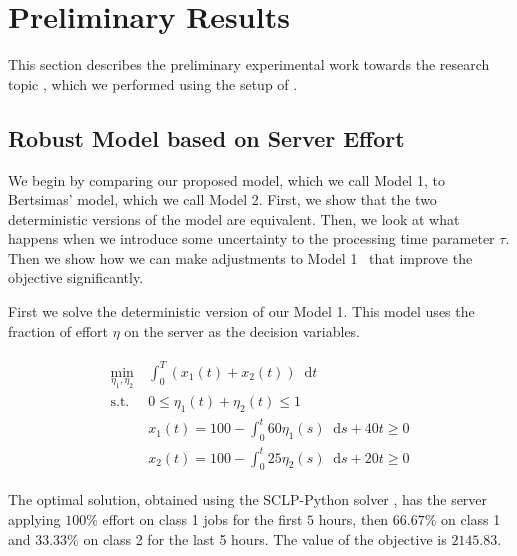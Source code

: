 \documentclass[11pt,a4paper,titlepage]{article}
\newcommand*{\dd}{\ensuremath{\mathop{}\!\mathrm{d}}}%
\theoremstyle{definition}
\theoremstyle{plain}
\begin{document}
    \section{Preliminary Results}
    \label{sec:results}

    \newcommand{\modelone}{Model 1}
    \newcommand{\modeltwo}{Model 2}

    This section describes the preliminary experimental work towards the research topic ,
    which we performed using the setup of .

    \subsection{Robust Model based on Server Effort}
    \label{subsec:results:server-effort-model}

    We begin by comparing our proposed model,
    which we call \modelone,
    to Bertsimas' model,
    which we call \modeltwo.
    First, we show that the two deterministic versions of the model are equivalent.
    Then,
    we look at what happens when we introduce some uncertainty to the processing time parameter $\tau$.
    Then we show how we can make adjustments to \modelone~ that improve the objective significantly.

    First we solve the deterministic version of our \modelone.
    This model uses the fraction of effort $\eta$ on the server as the decision variables.

    \begin{align}
        \label{eq:model-1}
        \begin{split}
            \min\limits_{\eta_1, \eta_2}
            &~ \int_0^T \left( x_1(t) + x_2(t) \right) \dd t \\
            \text{s.t.}
            &~ 0 \leq \eta_1(t) + \eta_2(t) \leq 1 \\
            &~ x_1(t) = 100 - \int_0^t 60 \eta_1(s) \dd s + 40t \geq 0 \\
            &~ x_2(t) = 100 - \int_0^t 25 \eta_2(s) \dd s + 20t \geq 0
        \end{split}
    \end{align}

    The optimal solution,
    obtained using the SCLP-Python solver \autocite{Shindin_SCLPPython_2021},
    has the server applying $100\%$ effort on class 1 jobs for the first $5$ hours,
    then $66.67\%$ on class 1 and 33.33\% on class 2 for the last 5 hours.
    The value of the objective is $2145.83$.
\end{document}

